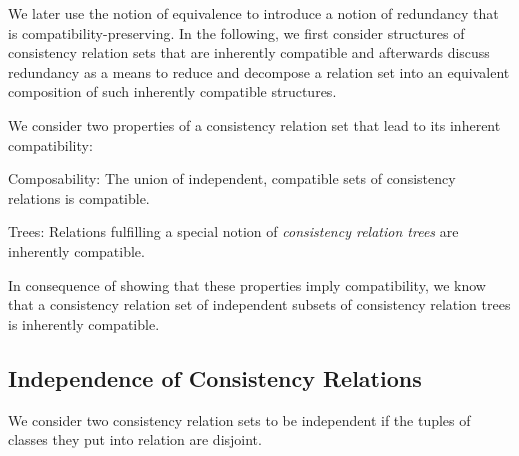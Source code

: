 We later use the notion of equivalence to introduce a notion of redundancy that is compatibility-preserving.
In the following, we first consider structures of consistency relation sets that are inherently compatible and afterwards discuss redundancy as a means to reduce and decompose a relation set into an equivalent composition of such inherently compatible structures.

We consider two properties of a consistency relation set that lead to its inherent compatibility:
\begin{properdescription}
    \item[Composability:] The union of independent, compatible sets of consistency relations is compatible.
    \item[Trees:] Relations fulfilling a special notion of \emph{consistency relation trees} are inherently compatible.
\end{properdescription}
In consequence of showing that these properties imply compatibility, we know that a consistency relation set of independent subsets of consistency relation trees is inherently compatible.


\subsection{Independence of Consistency Relations}
\label{chap:compatibility:formal_approach:independence}

We consider two consistency relation sets to be independent if the tuples of classes they put into relation are disjoint.

